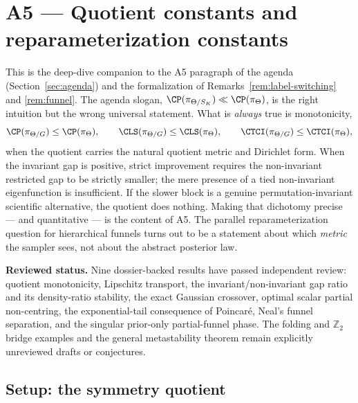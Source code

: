 \documentclass[../../main.tex]{subfiles}
\begin{document}
\section{A5 --- Quotient constants and reparameterization constants}
\label{sec:a5}

This is the deep-dive companion to the A5 paragraph of the agenda (Section~\ref{sec:agenda})
and the formalization of Remarks~\ref{rem:label-switching} and \ref{rem:funnel}. The agenda
slogan, $\CP(\pi_{\Theta/S_K})\ll\CP(\pi_\Theta)$, is the right intuition but the wrong
universal statement. What is \emph{always} true is monotonicity,
\[
  \CP(\pi_{\Theta/G})\le\CP(\pi_\Theta),\qquad
  \CLS(\pi_{\Theta/G})\le\CLS(\pi_\Theta),\qquad
  \CTCI(\pi_{\Theta/G})\le\CTCI(\pi_\Theta),
\]
when the quotient carries the natural quotient metric and Dirichlet form. When the invariant gap
is positive, strict improvement requires the non-invariant restricted gap to be strictly smaller;
the mere presence of a tied non-invariant eigenfunction is insufficient. If the slower block is a
genuine permutation-invariant scientific alternative, the quotient does nothing. Making that
dichotomy precise --- and quantitative ---
is the content of A5. The parallel reparameterization question for hierarchical funnels turns
out to be a statement about which \emph{metric} the sampler sees, not about the abstract
posterior law.

\noindent\textbf{Reviewed status.}
Nine dossier-backed results have passed independent review: quotient monotonicity, Lipschitz
transport, the invariant/non-invariant gap ratio and its density-ratio stability, the exact
Gaussian crossover, optimal scalar partial non-centring, the exponential-tail consequence of
Poincar\'e, Neal's funnel separation, and the singular prior-only partial-funnel phase. The folding
and $\mathbb Z_2$ bridge examples and the general metastability theorem remain explicitly
unreviewed drafts or conjectures.

\subsection{Setup: the symmetry quotient}
\label{subsec:a5-setup}
\end{document}

